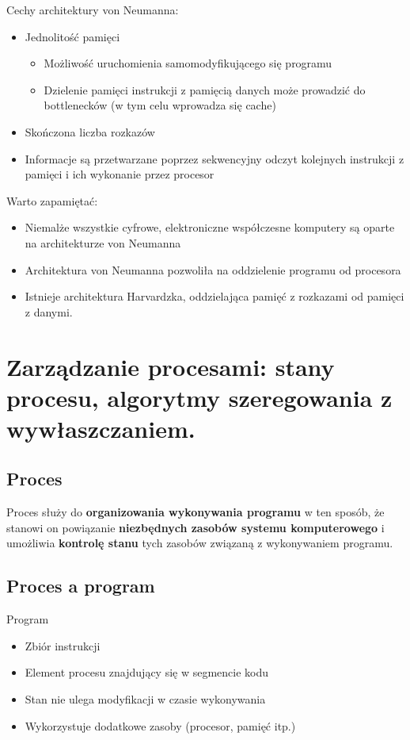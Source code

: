 \documentclass[12pt]{article}
\begin{document}
    Cechy architektury von Neumanna:
    \begin{itemize}
        \item Jednolitość pamięci
        \begin{itemize}
            \item Możliwość uruchomienia samomodyfikującego się programu
            \item Dzielenie pamięci instrukcji z pamięcią danych może prowadzić do bottlenecków (w tym celu wprowadza się cache)
        \end{itemize}
        \item Skończona liczba rozkazów
        \item Informacje są przetwarzane poprzez sekwencyjny odczyt kolejnych instrukcji z pamięci i ich wykonanie przez procesor
    \end{itemize}

    Warto zapamiętać:
    \begin{itemize}
        \item Niemalże wszystkie cyfrowe, elektroniczne współczesne komputery są oparte na architekturze von Neumanna
        \item Architektura von Neumanna pozwoliła na oddzielenie programu od procesora
        \item Istnieje architektura Harvardzka, oddzielająca pamięć z rozkazami od pamięci z danymi.
    \end{itemize}

    \newpage

    \section{Zarządzanie procesami: stany procesu, algorytmy szeregowania z wywłaszczaniem.}
    \subsection{Proces}
    Proces służy do \textbf{organizowania wykonywania programu} w ten sposób, że stanowi on powiązanie \textbf{niezbędnych zasobów systemu komputerowego} i umożliwia \textbf{kontrolę stanu} tych zasobów związaną z wykonywaniem programu.
    
    
    \subsection{Proces a program}
    Program
    \begin{itemize}
        \item Zbiór instrukcji
        \item Element procesu znajdujący się w segmencie kodu
        \item Stan nie ulega modyfikacji w czasie wykonywania
        \item Wykorzystuje dodatkowe zasoby (procesor, pamięć itp.)
    \end{itemize}
    
\end{document}

